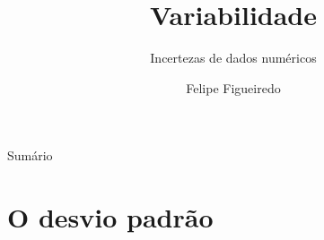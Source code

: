 \documentclass{beamer}
\title%
{Variabilidade}
\subtitle
{Incertezas de dados numéricos} %
\author%
{Felipe Figueiredo}%
\institute[] %
{
}
\date%
{}
\begin{document}
\begin{frame}
  \titlepage
\end{frame}

\begin{frame}{Sumário}
  \tableofcontents
\end{frame}








\section{O desvio padrão}
\end{document}
